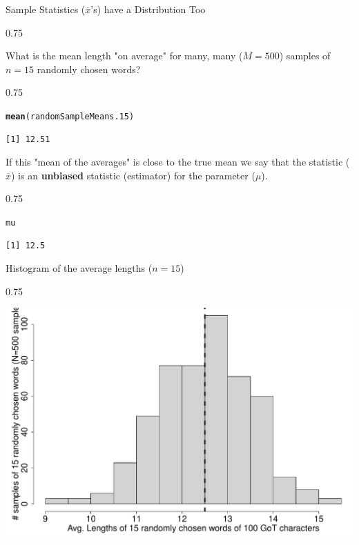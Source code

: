\documentclass{beamer}\usepackage[]{graphicx}\usepackage[]{color}
\makeatletter
\newcommand{\hlstd}[1]{\textcolor[rgb]{0.102,0.102,0.102}{#1}}%
\newcommand{\hlkwd}[1]{\textcolor[rgb]{0.102,0.102,0.102}{\textbf{#1}}}%
\newenvironment{kframe}{%
 \def\at@end@of@kframe{}%
 \ifinner\ifhmode%
  \def\at@end@of@kframe{\end{minipage}}%
  \begin{minipage}{\columnwidth}%
 \fi\fi%
 \def\FrameCommand##1{\hskip\@totalleftmargin \hskip-\fboxsep
 \colorbox{shadecolor}{##1}\hskip-\fboxsep
     \hskip-\linewidth \hskip-\@totalleftmargin \hskip\columnwidth}%
 \MakeFramed {\advance\hsize-\width
   \@totalleftmargin\z@ \linewidth\hsize
   \@setminipage}}%
 {\par\unskip\endMakeFramed%
 \at@end@of@kframe}
\newenvironment{knitrout}{}{} %
\renewenvironment{knitrout}{\begin{spacing}{0.75}\begin{tiny}}{\end{tiny}\end{spacing}}
\newcommand{\xbar}{\overline{x}}
\makeatother
\begin{document}
\begin{frame}{Sample Statistics ($\xbar$'s) have a Distribution Too\;\;}
\begin{knitrout}
\end{knitrout}

\newpage

What is the mean length "on average" for many, many ($M=500$)
samples of $n=15$ randomly chosen words?  
\begin{knitrout}\small
{}\color{fgcolor}\begin{kframe}
\begin{alltt}
\hlkwd{mean}\hlstd{(randomSampleMeans.15)}
\end{alltt}
\begin{verbatim}
[1] 12.51
\end{verbatim}
\end{kframe}
\end{knitrout}
If this "mean of the averages" is close to the true mean
we say that the statistic ($\xbar$) is an
\textbf{unbiased} statistic (estimator) for the parameter ($\mu$).
\begin{knitrout}\small
{}\color{fgcolor}\begin{kframe}
\begin{alltt}
\hlstd{mu}
\end{alltt}
\begin{verbatim}
[1] 12.5
\end{verbatim}
\end{kframe}
\end{knitrout}

\newpage

Histogram of the average lengths ($n=15$)
\begin{knitrout}\small
{}\color{fgcolor}

{\centering \includegraphics[width=0.79\linewidth]{figure/graphics-unnamed-chunk-45-1} 

}
\end{knitrout}
\end{frame}
\end{document}
